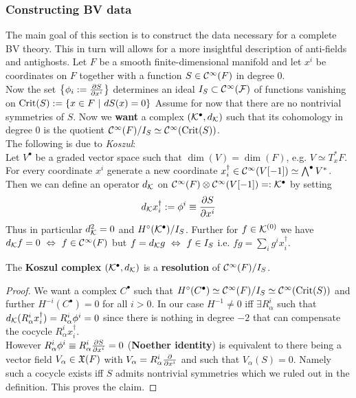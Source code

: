 \subsubsection{Constructing BV data}

The main goal of this section is to construct the data necessary for a complete BV theory. This in turn will allows for a more insightful description of anti-fields and antighosts. Let $F$ be a smooth finite-dimensional manifold and let ${x^i}$ be coordinates on $F$ together with a function $S \in \mathcal{C}^{\infty}(F)$ in degree $0$.\\

Now the set $\left\{\phi_i := \dell{S}{x^i}\right\}$ determines an ideal $I_S \subset \mathcal{C}^{\infty}({\mathcal{F}})$ of functions vanishing on $\operatorname{Crit}(S) := \{ x \in F \ | \ dS(x) = 0 \}$
Assume for now that there are no nontrivial symmetries of $S$. Now we \textbf{want} a complex $({\mathcal{K}}^\bullet, d_{{\mathcal{K}}})$ such that its cohomology in degree $0$ is the quotient $\mathcal{C}^{\infty}(F)/I_S \simeq \mathcal{C}^{\infty}(\operatorname{Crit}(S))$.\\

The following is due to \emph{Koszul}:\\
Let $V^\bullet$ be a graded vector space such that $\dim(V) = \dim(F)$, e.g. $V \simeq T^*_x F$. For every coordinate $x^i$ generate a new coordinate $x^\dagger_i \in \mathcal{C}^{\infty}(V[-1]) \simeq \bigwedge^\bullet V^*$. Then we can define an operator $d_{{\mathcal{K}}}$ on $\mathcal{C}^{\infty}(F) \otimes \mathcal{C}^{\infty}(V[-1]) =: {\mathcal{K}}^\bullet$ by setting
\begin{equation}
  d_\KK x^\dagger_i := \phi^i \equiv \dell{S}{x^i}
\end{equation}
Thus in particular $d_{{\mathcal{K}}}^2 = 0$ and $H^\circ({\mathcal{K}}^\bullet)/I_S$. Further for $f \in {\mathcal{K}}^{(0)}$ we have $d_{{\mathcal{K}}} f = 0 \ \Leftrightarrow \ f \in \mathcal{C}^{\infty}(F)$ but $f = d_\KK g \ \Leftrightarrow \ f \in I_S$ i.e. $fg = \sum_i g^i x^\dagger_i$.

\begin{prop}
  The \textbf{Koszul complex} $({\mathcal{K}}^\bullet, d_{{\mathcal{K}}})$ is a \textbf{resolution} of $\mathcal{C}^{\infty}(F)/I_S$.
\begin{proof}
  We want a complex $C^\bullet$ such that $H^\circ(C^\bullet) \simeq \mathcal{C}^{\infty}(F)/I_S \simeq \mathcal{C}^{\infty}(\operatorname{Crit}(S))$ and further $H^{-i} (C^\bullet) = 0$ for all $i > 0$. In our case $H^{-1} \neq 0$ iff $\exists R^i_\alpha$ such that $d_\KK (R^i_\alpha x^\dagger_i) = R^i_\alpha \phi^i = 0$ since there is nothing in degree $-2$ that can compensate the cocycle $R^i_\alpha x^\dagger_i$.\\

  However $R^i_\alpha \phi^i \equiv R^i_\alpha \dell{S}{x^i} = 0$ (\textbf{Noether identity}) is equivalent to there being a vector field $V_\alpha \in \mathfrak{X}(F)$ with $V_\alpha = R^i_\alpha \frac{\partial }{\partial x^i}$ and such that $V_\alpha(S) = 0$. Namely such a cocycle exists iff $S$ admits nontrivial symmetries which we ruled out in the definition. This proves the claim.
\end{proof}
\end{prop}

